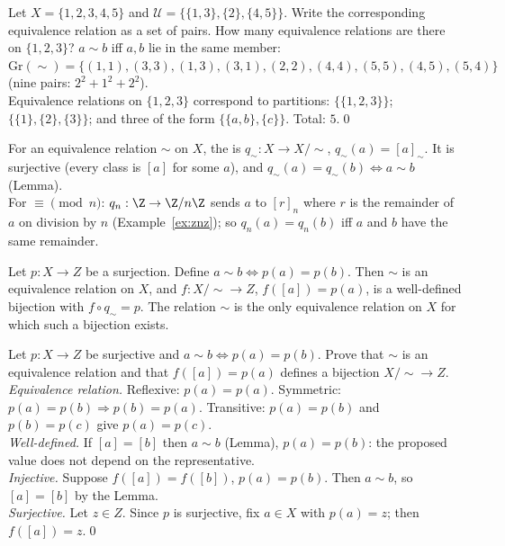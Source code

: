\begin{hexample}
Let $X=\{1,2,3,4,5\}$ and $\mathcal U=\{\{1,3\},\{2\},\{4,5\}\}$. Write the corresponding equivalence relation as a set of pairs. How many equivalence relations are there on $\{1,2,3\}$?
\solution
$a\sim b$ iff $a,b$ lie in the same member: $\mathrm{Gr}(\sim)=\{(1,1),(3,3),(1,3),(3,1),(2,2),(4,4),(5,5),(4,5),(5,4)\}$ (nine pairs: $2^2+1^2+2^2$).\\
Equivalence relations on $\{1,2,3\}$ correspond to partitions: $\{\{1,2,3\}\}$; $\{\{1\},\{2\},\{3\}\}$; and three of the form $\{\{a,b\},\{c\}\}$. Total: $5$.\qed
\end{hexample}

\begin{key}
For an equivalence relation $\sim$ on $X$, the  is $q_\sim:X\to X/{\sim}$, $q_\sim(a)=[a]_\sim$. It is surjective (every class is $[a]$ for some $a$), and $q_\sim(a)=q_\sim(b)\Leftrightarrow a\sim b$ (Lemma).\\
For $\equiv\pmod n$: $q_n:\Z\to\Z/n\Z$ sends $a$ to $[r]_n$ where $r$ is the remainder of $a$ on division by $n$ (Example~\ref{ex:znz}); so $q_n(a)=q_n(b)$ iff $a$ and $b$ have the same remainder.
\end{key}

\begin{result}
Let $p:X\to Z$ be a surjection. Define $a\sim b\Leftrightarrow p(a)=p(b)$. Then $\sim$ is an equivalence relation on $X$, and $f:X/{\sim}\to Z$, $f([a])=p(a)$, is a well-defined bijection with $f\circ q_\sim=p$. The relation $\sim$ is the only equivalence relation on $X$ for which such a bijection exists.
\end{result}

\begin{hexample}\label{ex:induced}
Let $p:X\to Z$ be surjective and $a\sim b\Leftrightarrow p(a)=p(b)$. Prove that $\sim$ is an equivalence relation and that $f([a])=p(a)$ defines a bijection $X/{\sim}\to Z$.
\solution
\emph{Equivalence relation.} Reflexive: $p(a)=p(a)$. Symmetric: $p(a)=p(b)\Rightarrow p(b)=p(a)$. Transitive: $p(a)=p(b)$ and $p(b)=p(c)$ give $p(a)=p(c)$.\\
\emph{Well-defined.} If $[a]=[b]$ then $a\sim b$ (Lemma), \ie $p(a)=p(b)$: the proposed value does not depend on the representative.\\
\emph{Injective.} Suppose $f([a])=f([b])$, \ie $p(a)=p(b)$. Then $a\sim b$, so $[a]=[b]$ by the Lemma.\\
\emph{Surjective.} Let $z\in Z$. Since $p$ is surjective, fix $a\in X$ with $p(a)=z$; then $f([a])=z$.\qed
\end{hexample}

